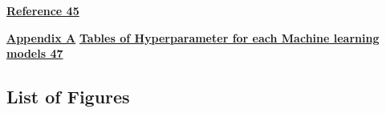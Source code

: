\documentclass[
]{article}
\begin{document}
\protect\hyperlink{reference}{\textbf{Reference 45}}

\protect\hyperlink{appendix-a}{\textbf{Appendix A}}
\protect\hyperlink{tables-of-hyperparameter-for-each-machine-learning-models}{\textbf{Tables
of Hyperparameter for each Machine learning models 47}}

\hypertarget{section}{%
\subsection{}\label{section}}

\hypertarget{section-1}{%
\subsection{}\label{section-1}}

\hypertarget{list-of-figures}{%
\subsection{\texorpdfstring{\textbf{List of
Figures}}{List of Figures}}\label{list-of-figures}}
\end{document}
